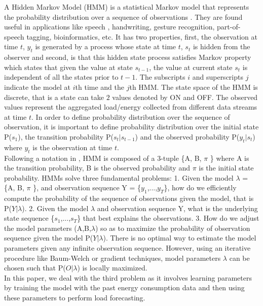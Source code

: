\documentclass{acm_proc_article-sp}
\begin{document}
A Hidden Markov Model (HMM) is a statistical Markov model that represents the probability distribution over a sequence of observations \cite{Ghahramani}. They are found useful in applications like speech \cite{Rabiner}, handwriting, gesture recognition, part-of-speech tagging, bioinformatics, etc. It has two properties, first, the observation at time $t$, $y_{t}$ is generated by a process whose state at time $t$, $s_{t}$ is hidden from the observer and second, is that this hidden state process satisfies Markov property which states that given the value at state $s_{t-1}$, the value at current state $s_{t}$ is independent of all the states prior to $t-1$. The subscripts $i$ and superscripts $j$ indicate the model at $i$th time and the $j$th HMM. The state space of the HMM is discrete, that is a state can take $2$ values denoted by ON and OFF. The observed values represent the aggregated load/energy collected from different data streams at time $t$. In order to define probability distribution over the sequence of observation, it is important to define probability distribution over the initial state P($s_{1}$), the transition probability P($s_{t}|s_{t-1}$) and the observed probability P($y_{t}|s_{t}$) where $y_{t}$ is the observation at time $t$. \\
Following a notation in \cite{Rabiner}, HMM is composed of a 3-tuple \{A, B, $\pi$ \} where A is the transition probability, B is the observed probability and $\pi$ is the initial state probability.
HMMs solve three fundamental problems:
1. Given the model $\lambda$ = \{A, B, $\pi$ \}, and observation sequence Y = \{$y_{1}$,...,$y_{T}$\}, how do we efficiently compute the probability of the sequence of observations given the model, that is P($Y|\lambda$).
2. Given the model $\lambda$ and observation sequence Y, what is the underlying state sequence \{$s_{1}$,...,$s_{T}$\} that best explains the observations.
3. How do we adjust the model parameters (A,B,$\lambda$) so as to maximize the probability of observation sequence given the model P($Y|\lambda$). There is no optimal way to estimate the model parameters given any infinite observation sequence. However, using an iterative procedure like Baum-Welch or gradient techniques, model parameters $\lambda$ can be chosen such that P($O|\lambda$) is locally maximized. \\
In this paper, we deal with the third problem as it involves learning parameters by training the model with the past energy consumption data and then using these parameters to perform load forecasting.\\
\end{document}
